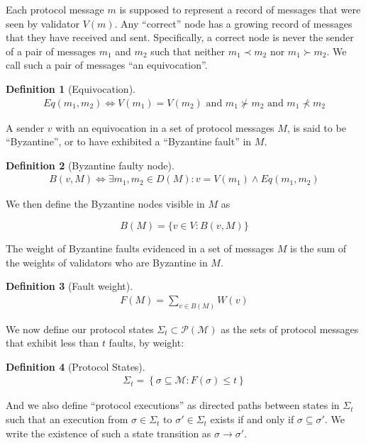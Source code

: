 \documentclass{article}
\theoremstyle{definition}
\newtheorem{defn}{Definition}[section]
\begin{document}
Each protocol message $m$ is supposed to represent a record of messages that were seen by validator $V(m)$. Any ``correct'' node has a growing record of messages that they have received and sent. Specifically, a correct node is never the sender of a pair of messages $m_1$ and $m_2$ such that neither $m_1 \prec m_2$ nor $m_1 \succ m_2$. We call such a pair of messages ``an equivocation''.


\begin{defn}[Equivocation]
\begin{align}
Eq(m_1, m_2) \iff V(m_1) = V(m_2) \text{ and } m_1 \nsucc m_2 \text{ and } m_1 \nprec m_2
\end{align}
\end{defn}

A sender $v$ with an equivocation in a set of protocol messages $M$, is said to be ``Byzantine'', or to have exhibited a ``Byzantine fault'' in $M$.

\begin{defn}[Byzantine faulty node]
\begin{align}
B(v,M) \iff \exists m_1, m_2 \in D(M) : v = V(m_1) \land Eq(m_1, m_2)
\end{align}
\end{defn}

We then define the Byzantine nodes visible in $M$ as

$$
B(M) = \{v \in V: B(v,M)\}
$$

The weight of Byzantine faults evidenced in a set of messages $M$ is the sum of the weights of validators who are Byzantine in $M$.

\begin{defn}[Fault weight]
\begin{align}
F(M) = \sum_{v \in B(M)} W(v)
\end{align}
\end{defn}

We now define our protocol states $\Sigma_t \subset \mathcal{P}(\mathcal{M})$ as the sets of protocol messages that exhibit less than $t$ faults, by weight:

\begin{defn}[Protocol States]
\begin{align}
\Sigma_t = \left\{\sigma \subseteq \mathcal{M}: F(\sigma) \leq t \right\}
\end{align}
\end{defn}

And we also define ``protocol executions'' as directed paths between states in $\Sigma_t$ such that an execution from $\sigma \in \Sigma_t$ to $\sigma' \in \Sigma_t$ exists if and only if $\sigma \subseteq \sigma'$. We write the existence of such a state transition as $\sigma \to \sigma'$.
\end{document}
